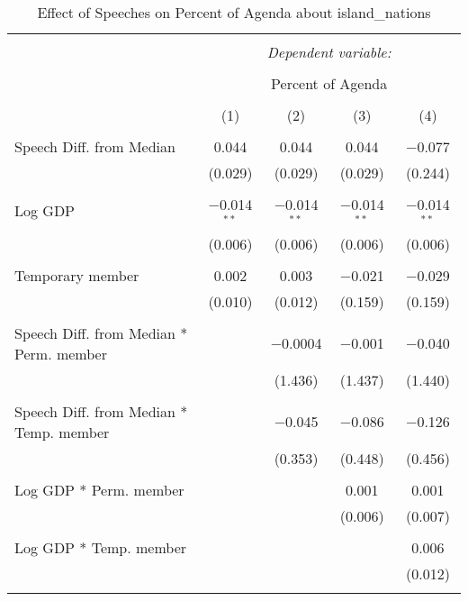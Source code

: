 
\begin{table}[!htbp] \centering 
  \caption{Effect of Speeches on Percent of Agenda about island_nations} 
  \label{} 
\begin{tabular}{@{\extracolsep{5pt}}lcccc} 
\\[-1.8ex]\hline 
\hline \\[-1.8ex] 
 & \multicolumn{4}{c}{\textit{Dependent variable:}} \\ 
\cline{2-5} 
\\[-1.8ex] & \multicolumn{4}{c}{Percent of Agenda} \\ 
\\[-1.8ex] & (1) & (2) & (3) & (4)\\ 
\hline \\[-1.8ex] 
 Speech Diff. from Median & 0.044 & 0.044 & 0.044 & $-$0.077 \\ 
  & (0.029) & (0.029) & (0.029) & (0.244) \\ 
  & & & & \\ 
 Log GDP & $-$0.014$^{**}$ & $-$0.014$^{**}$ & $-$0.014$^{**}$ & $-$0.014$^{**}$ \\ 
  & (0.006) & (0.006) & (0.006) & (0.006) \\ 
  & & & & \\ 
 Temporary member & 0.002 & 0.003 & $-$0.021 & $-$0.029 \\ 
  & (0.010) & (0.012) & (0.159) & (0.159) \\ 
  & & & & \\ 
 Speech Diff. from Median * Perm. member &  & $-$0.0004 & $-$0.001 & $-$0.040 \\ 
  &  & (1.436) & (1.437) & (1.440) \\ 
  & & & & \\ 
 Speech Diff. from Median * Temp. member &  & $-$0.045 & $-$0.086 & $-$0.126 \\ 
  &  & (0.353) & (0.448) & (0.456) \\ 
  & & & & \\ 
 Log GDP * Perm. member &  &  & 0.001 & 0.001 \\ 
  &  &  & (0.006) & (0.007) \\ 
  & & & & \\ 
 Log GDP * Temp. member &  &  &  & 0.006 \\ 
  &  &  &  & (0.012) \\ 
  & & & & \\ 

\end{tabular}
\end{table}
